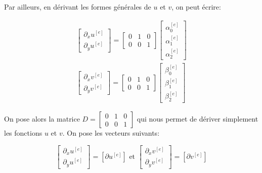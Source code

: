 \documentclass{article}
\begin{document}
Par ailleurs, en dérivant les formes générales
de $u$ et $v$, on peut écrire:

\begin{align}
    \begin{bmatrix}
    \partial_x u^{[e]} \\ \partial_y u^{[e]}
    \end{bmatrix}
    =
    \begin{bmatrix}
    0 & 1 & 0 \\
    0 & 0 & 1
    \end{bmatrix}
    \begin{bmatrix}
    \alpha_0^{[e]} \\ \alpha_1^{[e]} \\ \alpha_2^{[e]}
    \end{bmatrix} \\
    \begin{bmatrix}
    \partial_x v^{[e]} \\ \partial_y v^{[e]}
    \end{bmatrix}
    =
    \begin{bmatrix}
    0 & 1 & 0 \\
    0 & 0 & 1
    \end{bmatrix}
    \begin{bmatrix}
    \beta_0^{[e]} \\ \beta_1^{[e]} \\ \beta_2^{[e]}
    \end{bmatrix}
\end{align}

On pose alors la matrice $D =
\begin{bmatrix}
    0 & 1 & 0 \\
    0 & 0 & 1
\end{bmatrix} $
qui nous permet de dériver simplement les fonctions $u$ et $v$.
On pose les vecteurs suivants:

\begin{equation}
    \begin{bmatrix}
        \partial_x u^{[e]} \\ \partial_y u^{[e]}
    \end{bmatrix}
    =
    \left[ \partial u^{[e]} \right]
    \text{ et }
    \begin{bmatrix}
        \partial_x v^{[e]} \\ \partial_y v^{[e]}
    \end{bmatrix}
    =
    \left[ \partial v^{[e]} \right]
\end{equation}
\end{document}
